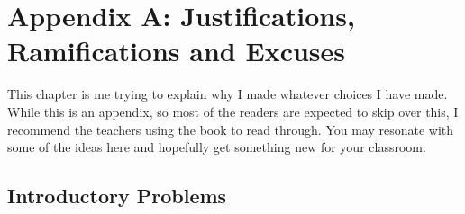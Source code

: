 \chapter{Appendix A: Justifications, Ramifications and Excuses}
This chapter is me trying to explain why I made whatever choices I have made. While this is an appendix, so most of the readers are expected to skip over this, I recommend the teachers using the book to read through. You may resonate with some of the ideas here and hopefully get something new for your classroom.\\
\section{Introductory Problems}